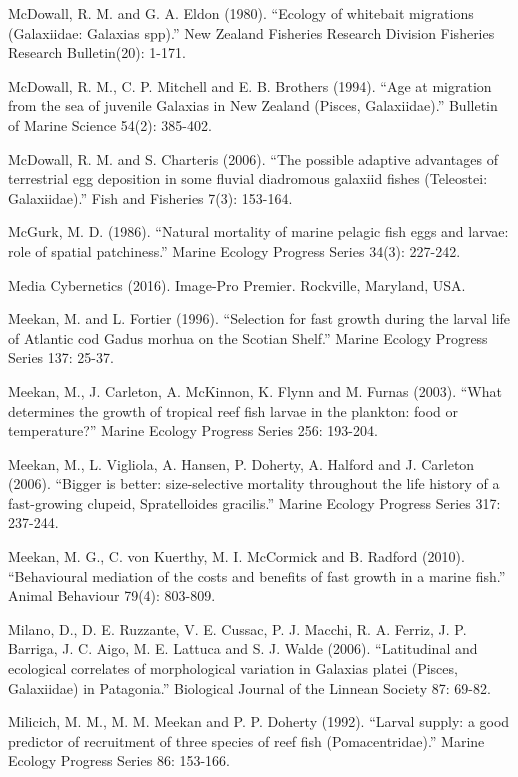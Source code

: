 \documentclass[]{book}
\begin{document}
McDowall, R. M. and G. A. Eldon (1980). ``Ecology of whitebait
migrations (Galaxiidae: Galaxias spp).'' New Zealand Fisheries Research
Division Fisheries Research Bulletin(20): 1-171.

McDowall, R. M., C. P. Mitchell and E. B. Brothers (1994). ``Age at
migration from the sea of juvenile Galaxias in New Zealand (Pisces,
Galaxiidae).'' Bulletin of Marine Science 54(2): 385-402.

McDowall, R. M. and S. Charteris (2006). ``The possible adaptive
advantages of terrestrial egg deposition in some fluvial diadromous
galaxiid fishes (Teleostei: Galaxiidae).'' Fish and Fisheries 7(3):
153-164.

McGurk, M. D. (1986). ``Natural mortality of marine pelagic fish eggs
and larvae: role of spatial patchiness.'' Marine Ecology Progress Series
34(3): 227-242.

Media Cybernetics (2016). Image-Pro Premier. Rockville, Maryland, USA.

Meekan, M. and L. Fortier (1996). ``Selection for fast growth during the
larval life of Atlantic cod Gadus morhua on the Scotian Shelf.'' Marine
Ecology Progress Series 137: 25-37.

Meekan, M., J. Carleton, A. McKinnon, K. Flynn and M. Furnas (2003).
``What determines the growth of tropical reef fish larvae in the
plankton: food or temperature?'' Marine Ecology Progress Series 256:
193-204.

Meekan, M., L. Vigliola, A. Hansen, P. Doherty, A. Halford and J.
Carleton (2006). ``Bigger is better: size-selective mortality throughout
the life history of a fast-growing clupeid, Spratelloides gracilis.''
Marine Ecology Progress Series 317: 237-244.

Meekan, M. G., C. von Kuerthy, M. I. McCormick and B. Radford (2010).
``Behavioural mediation of the costs and benefits of fast growth in a
marine fish.'' Animal Behaviour 79(4): 803-809.

Milano, D., D. E. Ruzzante, V. E. Cussac, P. J. Macchi, R. A. Ferriz, J.
P. Barriga, J. C. Aigo, M. E. Lattuca and S. J. Walde (2006).
``Latitudinal and ecological correlates of morphological variation in
Galaxias platei (Pisces, Galaxiidae) in Patagonia.'' Biological Journal
of the Linnean Society 87: 69-82.

Milicich, M. M., M. M. Meekan and P. P. Doherty (1992). ``Larval supply:
a good predictor of recruitment of three species of reef fish
(Pomacentridae).'' Marine Ecology Progress Series 86: 153-166.
\end{document}

